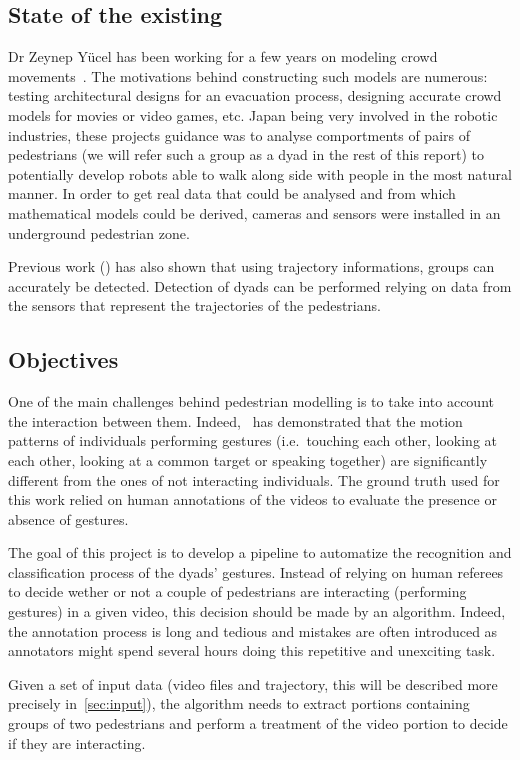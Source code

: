 \documentclass[12pt,a4paper,twoside]{article}
\begin{document}
\subsection{State of the existing}
Dr Zeynep Yücel has been working for a few years on modeling crowd movements~\cite{Zanlungo2017}\cite{Yucel2013}\cite{Yucel2017}. The motivations behind constructing such models are numerous: testing architectural designs for an evacuation process, designing accurate crowd models for movies or video games, etc. Japan being very involved in the robotic industries, these projects guidance was to analyse comportments of pairs of pedestrians (we will refer such a group as a dyad in the rest of this report) to potentially develop robots able to walk along side with people in the most natural manner. In order to get real data that could be analysed and from which mathematical models could be derived, cameras and sensors were installed in an underground pedestrian zone. 

Previous work (\cite{Yucel2013}) has also shown that using trajectory informations, groups can accurately be detected. Detection of dyads can be performed relying on data from the sensors that represent the trajectories of the pedestrians.

\subsection{Objectives}
One of the main challenges behind pedestrian modelling is to take into account the interaction between them. Indeed,~\cite{Yucel2017} has demonstrated that the motion patterns of individuals performing gestures (i.e.~touching each other, looking at each other, looking at a common target or speaking together) are significantly different from the ones of not interacting individuals. The ground truth used for this work relied on human annotations of the videos to evaluate the presence or absence of gestures.

The goal of this project is to develop a pipeline to automatize the recognition and classification process of the dyads' gestures. Instead of relying on human referees to decide wether or not a couple of pedestrians are interacting (performing gestures) in a given video, this decision should be made by an algorithm. Indeed, the annotation process is long and tedious and mistakes are often introduced as annotators might spend several hours doing this repetitive and unexciting task.

Given a set of input data (video files and trajectory, this will be described more precisely in~\ref{sec:input}), the algorithm needs to extract portions containing groups of two pedestrians and perform a treatment of the video portion to decide if they are interacting.
\end{document}
